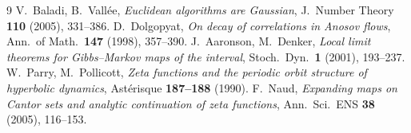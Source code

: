 \documentclass[11pt]{article}
\theoremstyle{definition}\newtheorem{definition}{Definition}
\theoremstyle{remark}\newtheorem{remark}{Remark}
\begin{document}
\begin{thebibliography}{9}
 V.\ Baladi, B.\ Vall\'ee, \emph{Euclidean algorithms are Gaussian}, J.\ Number Theory \textbf{110} (2005), 331--386.
 D.\ Dolgopyat, \emph{On decay of correlations in Anosov flows}, Ann.\ of Math.\ \textbf{147} (1998), 357--390.
 J.\ Aaronson, M.\ Denker, \emph{Local limit theorems for Gibbs--Markov maps of the interval}, Stoch.\ Dyn.\ \textbf{1} (2001), 193--237.
 W.\ Parry, M.\ Pollicott, \emph{Zeta functions and the periodic orbit structure of hyperbolic dynamics}, Ast\'erisque \textbf{187--188} (1990).
 F.\ Naud, \emph{Expanding maps on Cantor sets and analytic continuation of zeta functions}, Ann.\ Sci.\ ENS \textbf{38} (2005), 116--153.
\end{thebibliography}
\end{document}
